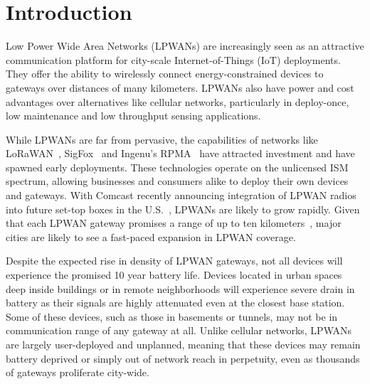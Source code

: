 
\vspace{-14pt}

\section{Introduction}
\label{sec:intro}

Low Power Wide Area Networks (LPWANs) are increasingly seen as an attractive
communication platform for city-scale Internet-of-Things (IoT) deployments.
They offer the ability to wirelessly connect energy-constrained devices to
gateways over distances of many kilometers. LPWANs also have power and cost
advantages over alternatives like cellular networks, particularly in
deploy-once, low maintenance and low throughput sensing applications.

While LPWANs are far from pervasive, the capabilities of networks like
LoRaWAN~\cite{Sornin2015, LoRaWanAlliance2015}, SigFox~\cite{centenaro2016}
and Ingenu's RPMA~\cite{Ingenu2015} have attracted investment and have spawned
early deployments. These technologies operate on the unlicensed ISM spectrum,
allowing businesses and consumers alike to deploy their own devices and
gateways. With Comcast recently announcing integration of LPWAN radios into
future set-top boxes in the U.S.~\cite{comcast2}, LPWANs are likely
to grow rapidly. Given that each LPWAN gateway promises a range of up to ten
kilometers~\cite{LoRaWanAlliance2015}, major cities are likely to see a
fast-paced expansion in LPWAN coverage.

Despite the expected rise in density of LPWAN gateways, not all devices will
experience the promised 10 year battery life. Devices located in urban spaces
deep inside buildings or in remote neighborhoods will experience severe drain
in battery as their signals are highly attenuated even at the closest base
station. Some of these devices, such as those in basements or tunnels, may not
be in communication range of any gateway at all. Unlike cellular networks,
LPWANs are largely user-deployed and unplanned, meaning that these devices may
remain battery deprived or simply out of network reach in perpetuity, even as
thousands of gateways proliferate city-wide.



